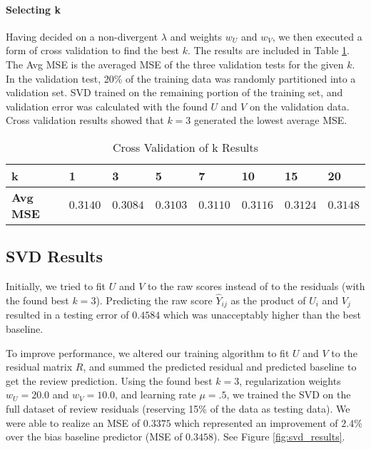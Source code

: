 \documentclass[12pt]{article}
\begin{document}
\paragraph{Selecting k} Having decided on a non-divergent $\lambda$ and weights $w_U$ and $w_V$, we then executed a form of cross validation to find the best $k$. The results are included in Table \ref{tab:k_selection}. The Avg MSE is the averaged MSE of the three validation tests for the given $k$. In the validation test, 20\% of the training data was randomly partitioned into a validation set. SVD trained on the remaining portion of the training set, and validation error was calculated with the found $U$ and $V$ on the validation data. Cross validation results showed that $k = 3$ generated the lowest average MSE. 

\begin{table}[ht!]
\centering
\caption{Cross Validation of k Results}
\label{tab:k_selection}
\vspace{2mm}
\begin{tabular}{llllllll}
\hline
\textbf{k}             &  1 				& \textbf{3}          	& 5             & 7             & 10        & 15        & 20 \\ \hline
\textbf{Avg MSE}       & $0.3140$		& {$\mathbf{0.3084}$}   	& $0.3103$      & $0.3110$      & $0.3116$  & $0.3124$  & $0.3148$\\ \hline
\end{tabular}
\end{table}

\subsection*{SVD Results}
Initially, we tried to fit $U$ and $V$ to the raw scores instead of to the residuals (with the found best $k = 3$). Predicting the raw score $\hat Y_{ij}$ as the product of $U_i$ and $V_j$ resulted in a testing error of $0.4584$ which was unacceptably higher than the best baseline.

To improve performance, we altered our training algorithm to fit $U$ and $V$ to the residual matrix $R$, and summed the predicted residual and predicted baseline to get the review prediction. Using the found best $k = 3$, regularization weights $w_U = 20.0$ and $w_V = 10.0$, and learning rate $\mu = .5$, we trained the SVD on the full dataset of review residuals (reserving 15\% of the data as testing data). We were able to realize an MSE of $0.3375$ which represented an improvement of $2.4\%$ over the bias baseline predictor (MSE of $0.3458$). See Figure \ref{fig:svd_results}.
\end{document}
